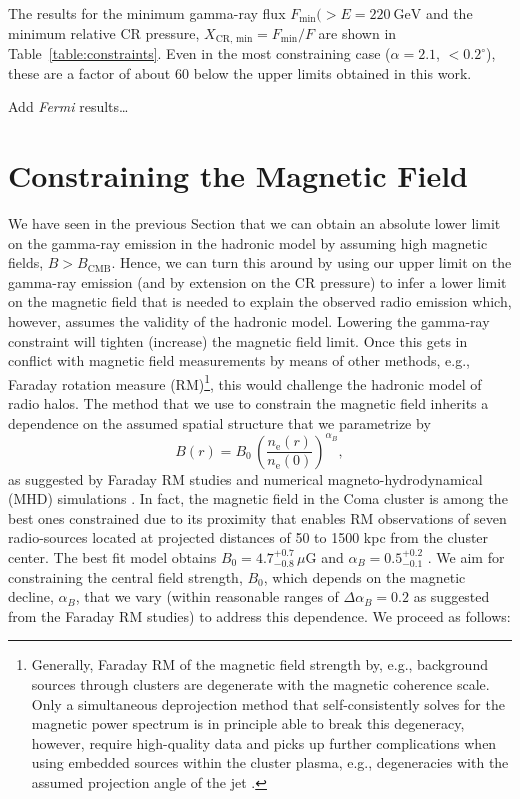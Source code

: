 \documentclass[12pt,manuscript]{aastex}
\newcommand{\rmn}{\mathrm}
\newcommand{\CR}{\mathrm{CR}}
\begin{document}
The results for the minimum gamma-ray flux $F_{\rmn{min}}(>E=220~\rmn{GeV}$ and
the minimum relative CR pressure, $X_{\CR,\,\rmn{min}} = F_{\rmn{min}}/F$ are
shown in Table~\ref{table:constraints}. Even in the most constraining case
($\alpha=2.1$, $<0.2^\circ$), these are a factor of about 60 below the upper
limits obtained in this work. 

Add {\em Fermi} results\ldots



\section{Constraining the Magnetic Field}
\label{sec:B}


We have seen in the previous Section that we can obtain an absolute lower limit
on the gamma-ray emission in the hadronic model by assuming high magnetic
fields, $B>B_\rmn{CMB}$. Hence, we can turn this around by using our upper limit
on the gamma-ray emission (and by extension on the CR pressure) to infer a lower
limit on the magnetic field that is needed to explain the observed radio
emission which, however, assumes the validity of the hadronic model. Lowering
the gamma-ray constraint will tighten (increase) the magnetic field limit. Once
this gets in conflict with magnetic field measurements by means of other
methods, e.g., Faraday rotation measure (RM)\footnote{Generally, Faraday RM
  of the magnetic field strength by, e.g., background sources through clusters
  are degenerate with the magnetic coherence scale. Only a simultaneous
  deprojection method that self-consistently solves for the magnetic power
  spectrum is in principle able to break this degeneracy, however, require
  high-quality data and picks up further complications when using embedded
  sources within the cluster plasma, e.g., degeneracies with the assumed
  projection angle of the jet \citep{article:KucharEnsslin:2011}.}, this would
challenge the hadronic model of radio halos.  The method that we use to
constrain the magnetic field inherits a dependence on the assumed spatial
structure that we parametrize by
\begin{equation}
  \label{eq:B}
  B(r) = B_0  \,\left(\frac{n_\rmn{e}(r)}{n_\rmn{e}(0)}\right)^{\alpha_B},
\end{equation}
as suggested by Faraday RM studies and numerical magneto-hydrodynamical (MHD)
simulations \citep[][and references therein]{article:Bonafede_etal:2010, article:Bonafede_etal:2011}. In fact, the magnetic field in the Coma cluster is among
the best ones constrained due to its proximity that enables RM observations of
seven radio-sources located at projected distances of 50 to 1500 kpc from the
cluster center. The best fit model obtains $B_0 = 4.7^{+0.7}_{-0.8}\,\mu$G and
$\alpha_B = 0.5^{+0.2}_{-0.1}$ \citep{article:Bonafede_etal:2010}.  We aim for
constraining the central field strength, $B_0$, which depends on the magnetic
decline, $\alpha_B$, that we vary (within reasonable ranges of
$\Delta\alpha_B=0.2$ as suggested from the Faraday RM studies) to address this
dependence. We proceed as follows:
\end{document}

